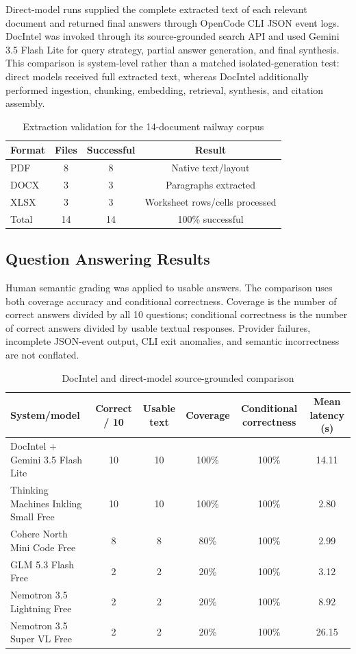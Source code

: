 \documentclass[conference]{IEEEtran}
\begin{document}
Direct-model runs supplied the complete extracted text of each relevant document and returned final answers through OpenCode CLI JSON event logs. DocIntel was invoked through its source-grounded search API and used Gemini 3.5 Flash Lite for query strategy, partial answer generation, and final synthesis. This comparison is system-level rather than a matched isolated-generation test: direct models received full extracted text, whereas DocIntel additionally performed ingestion, chunking, embedding, retrieval, synthesis, and citation assembly.

\begin{table}[!t]
\centering
\caption{Extraction validation for the 14-document railway corpus}
\label{tab:extract}
\small
\begin{tabular}{lccc}
\toprule
\rowcolor{docintelLightBlue}
Format & Files & Successful & Result \\
\midrule
PDF & 8 & 8 & Native text/layout \\
DOCX & 3 & 3 & Paragraphs extracted \\
XLSX & 3 & 3 & Worksheet rows/cells processed \\
\midrule
Total & 14 & 14 & 100\% successful \\
\bottomrule
\end{tabular}
\end{table}

\subsection{Question Answering Results}
Human semantic grading was applied to usable answers. The comparison uses both coverage accuracy and conditional correctness. Coverage is the number of correct answers divided by all 10 questions; conditional correctness is the number of correct answers divided by usable textual responses. Provider failures, incomplete JSON-event output, CLI exit anomalies, and semantic incorrectness are not conflated.

\begin{table}[!t]
\centering
\caption{DocIntel and direct-model source-grounded comparison}
\label{tab:model-results}
\small
\setlength{\tabcolsep}{4pt}
\begin{tabular}{lccccc}
\toprule
\rowcolor{docintelLightBlue}
System/model & Correct / 10 & Usable text & Coverage & Conditional correctness & Mean latency (s) \\
\midrule
DocIntel + Gemini 3.5 Flash Lite & 10 & 10 & 100\% & 100\% & 14.11 \\
Thinking Machines Inkling Small Free & 10 & 10 & 100\% & 100\% & 2.80 \\
Cohere North Mini Code Free & 8 & 8 & 80\% & 100\% & 2.99 \\
GLM 5.3 Flash Free & 2 & 2 & 20\% & 100\% & 3.12 \\
Nemotron 3.5 Lightning Free & 2 & 2 & 20\% & 100\% & 8.92 \\
Nemotron 3.5 Super VL Free & 2 & 2 & 20\% & 100\% & 26.15 \\
\bottomrule
\end{tabular}
\end{table}
\end{document}
